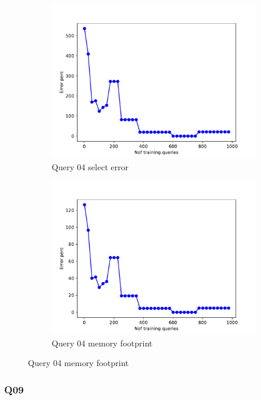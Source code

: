 \begin{figure}[!htb]
  \begin{subfigure}[t]{0.5\textwidth}
    \includegraphics[scale=0.4]{figs/airtraffic/airtraffic_sel04_error.pdf}
    \caption{Query 04 select error}
    \label{fig:sel04}
  \end{subfigure}
  \begin{subfigure}[t]{0.5\textwidth}
    \includegraphics[scale=0.4]{figs/airtraffic/airtraffic_q04_memerror.pdf}
    \caption{Query 04 memory footprint}
    \label{fig:mem04}
   \end{subfigure}
\end{figure}

\subsubsection{Q09}

